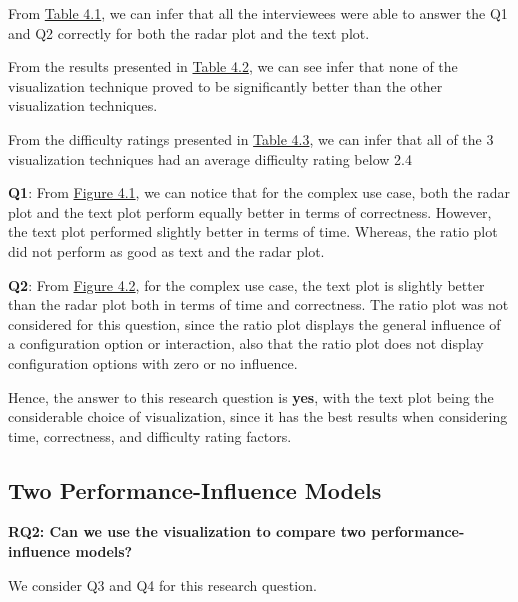 \begin{description}[leftmargin=0pt]
\item[Correctness: ] From \hyperref[table:correctness]{Table 4.1}, we can infer that all the interviewees were able to answer the Q1 and Q2 correctly for both the radar plot and the text plot. 

\item[Time Measurements: ] From the results presented in \hyperref[table:time]{Table 4.2}, we can see infer that none of the visualization technique proved to be significantly better than the other visualization techniques. 

\item[Difficulty Ratings: ] From the difficulty ratings presented in \hyperref[table:rating]{Table 4.3}, we can infer that all of the 3 visualization techniques had an average difficulty rating below 2.4
\end{description}

\textbf{Q1}: From \hyperref[figure:paretoOneQ1]{Figure 4.1}, we can notice that for the complex use case, both the radar plot and the text plot perform equally better in terms of correctness. However, the text plot performed slightly better in terms of time. Whereas, the ratio plot did not perform as good as text and the radar plot.

\textbf{Q2}: From \hyperref[figure:paretoOneQ2]{Figure 4.2}, for the complex use case, the text plot is slightly better than the radar plot both in terms of time and correctness. The ratio plot was not considered for this question, since the ratio plot displays the general influence of a configuration option or interaction, also that the ratio plot does not display configuration options with zero or no influence.


Hence, the answer to this research question is \textbf{yes}, with the text plot being the considerable choice of visualization, since it has the best results when considering time, correctness, and difficulty rating factors.

\subsection*{Two Performance-Influence Models}
\vskip 0.2in
\begin{mdframed}
\textbf{RQ2: Can we use the visualization to compare two performance-influence models?}
\end{mdframed}

We consider Q3 and Q4 for this research question.

